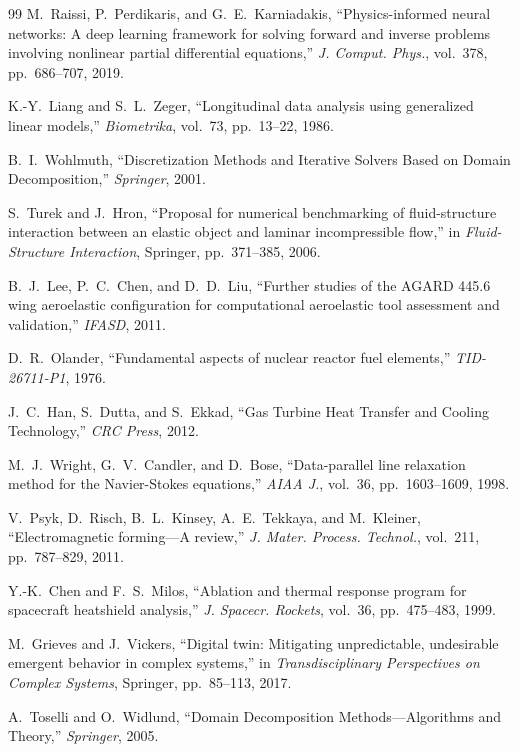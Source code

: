 \documentclass[11pt,a4paper]{article}
\theoremstyle{definition}
\begin{document}
\begin{thebibliography}{99}
M.~Raissi, P.~Perdikaris, and G.~E.~Karniadakis, ``Physics-informed neural networks: A deep learning framework for solving forward and inverse problems involving nonlinear partial differential equations,'' \textit{J. Comput. Phys.}, vol.~378, pp.~686--707, 2019.

K.-Y.~Liang and S.~L.~Zeger, ``Longitudinal data analysis using generalized linear models,'' \textit{Biometrika}, vol.~73, pp.~13--22, 1986.

B.~I.~Wohlmuth, ``Discretization Methods and Iterative Solvers Based on Domain Decomposition,'' \textit{Springer}, 2001.

S.~Turek and J.~Hron, ``Proposal for numerical benchmarking of fluid-structure interaction between an elastic object and laminar incompressible flow,'' in \textit{Fluid-Structure Interaction}, Springer, pp.~371--385, 2006.

B.~J.~Lee, P.~C.~Chen, and D.~D.~Liu, ``Further studies of the AGARD 445.6 wing aeroelastic configuration for computational aeroelastic tool assessment and validation,'' \textit{IFASD}, 2011.

D.~R.~Olander, ``Fundamental aspects of nuclear reactor fuel elements,'' \textit{TID-26711-P1}, 1976.

J.~C.~Han, S.~Dutta, and S.~Ekkad, ``Gas Turbine Heat Transfer and Cooling Technology,'' \textit{CRC Press}, 2012.

M.~J.~Wright, G.~V.~Candler, and D.~Bose, ``Data-parallel line relaxation method for the Navier-Stokes equations,'' \textit{AIAA J.}, vol.~36, pp.~1603--1609, 1998.

V.~Psyk, D.~Risch, B.~L.~Kinsey, A.~E.~Tekkaya, and M.~Kleiner, ``Electromagnetic forming---A review,'' \textit{J. Mater. Process. Technol.}, vol.~211, pp.~787--829, 2011.

Y.-K.~Chen and F.~S.~Milos, ``Ablation and thermal response program for spacecraft heatshield analysis,'' \textit{J. Spacecr. Rockets}, vol.~36, pp.~475--483, 1999.

M.~Grieves and J.~Vickers, ``Digital twin: Mitigating unpredictable, undesirable emergent behavior in complex systems,'' in \textit{Transdisciplinary Perspectives on Complex Systems}, Springer, pp.~85--113, 2017.

A.~Toselli and O.~Widlund, ``Domain Decomposition Methods---Algorithms and Theory,'' \textit{Springer}, 2005.


\end{thebibliography}
\end{document}
